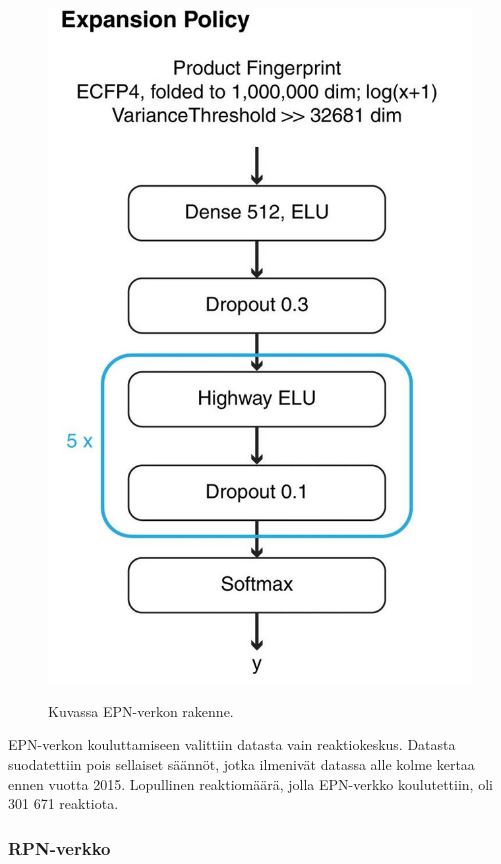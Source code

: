 \documentclass[finnish,twoside,censored,tkt,sw-line]{HYthesisML}
\begin{document}
\begin{figure}[!ht]
    \centering
    \includegraphics[]{expansion-policy.jpg}
    \caption{Kuvassa EPN-verkon rakenne.}
    {\cite{SeglerMarwinHS2018Pcsw}}
    {\label{fig:3n-mcts-epn}}
\end{figure}

EPN-verkon kouluttamiseen valittiin datasta vain reaktiokeskus.
Datasta suodatettiin pois sellaiset säännöt, jotka ilmenivät datassa alle kolme kertaa ennen vuotta 2015.
Lopullinen reaktiomäärä, jolla EPN-verkko koulutettiin, oli 301 671 reaktiota.

\subsubsection{RPN-verkko}
\end{document}

